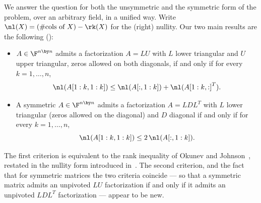 We answer the question for both the unsymmetric and the symmetric form of
the problem, over an arbitrary field, in a unified way.  Write
$\nl(X) = (\#\text{cols of } X) - \rk(X)$ for the (right) nullity.  Our two
main results are the following ():
\begin{itemize}
  \item $A \in \F^{n \by n}$ admits a factorization $A = LU$ with $L$ lower
    triangular and $U$ upper triangular, zeros allowed on both diagonals, if
    and only if for every $k = 1, \ldots, n$,
    \[
      \nl(A[1:k,1:k]) \le \nl(A[:,1:k]) + \nl({A[1:k,:]}^T) .
    \]
  \item A symmetric $A \in \F^{n \by n}$ admits a factorization $A = LDL^T$
    with $L$ lower triangular (zeros allowed on the diagonal) and $D$
    diagonal if and only if for every $k = 1, \ldots, n$,
    \[
      \nl(A[1:k,1:k]) \le 2 \, \nl(A[:,1:k]) .
    \]
\end{itemize}
The first criterion is equivalent to the rank inequality of Okunev and
Johnson~\cite{okunev_johnson_2005,johnson_okunev_2025}, restated in the
nullity form introduced in~\cite{darve_lu_2026}.  The second criterion, and
the fact that for symmetric matrices the two criteria coincide --- so that a
symmetric matrix admits an unpivoted $LU$ factorization if and only if it
admits an unpivoted $LDL^T$ factorization --- appear to be new.

